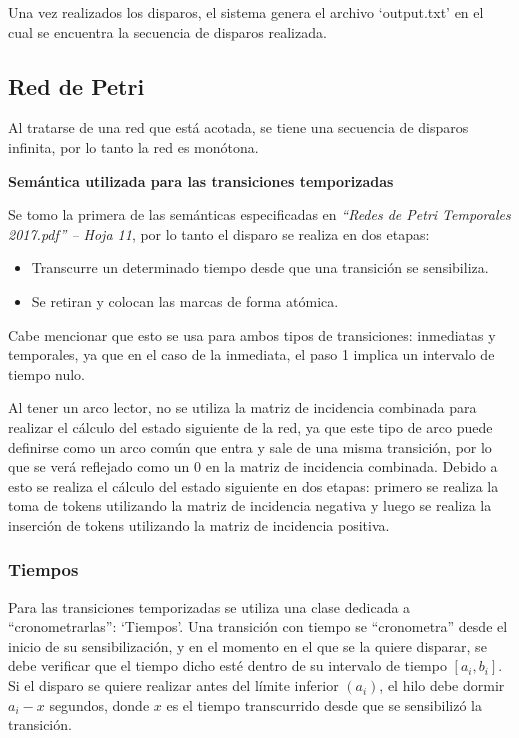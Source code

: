 \documentclass[12pt,a4paper]{article}
\begin{document}
Una vez realizados los disparos, el sistema genera el archivo `output.txt' en el cual se encuentra la secuencia de disparos realizada.

\subsection{Red de Petri}
Al tratarse de una red que está acotada, se tiene una secuencia de disparos infinita, por lo tanto la red es monótona.

\textbf{Semántica utilizada para las transiciones temporizadas}

Se tomo la primera de las semánticas especificadas en \textit{“Redes de Petri Temporales 2017.pdf” -- Hoja 11}, por lo tanto el disparo se realiza en dos etapas:

\begin{itemize}[leftmargin=1.5cm]
    \item Transcurre un determinado tiempo desde que una transición se sensibiliza.
    \item Se retiran y colocan las marcas de forma atómica.
\end{itemize}

Cabe mencionar que esto se usa para ambos tipos de transiciones: inmediatas y temporales, ya que en el caso de la inmediata, el paso 1 implica un intervalo de tiempo nulo.

Al tener un arco lector, no se utiliza la matriz de incidencia combinada para realizar el cálculo del estado siguiente de la red, ya que este tipo de arco puede definirse como un arco común que entra y sale de una misma transición, por lo que se verá reflejado como un 0 en la matriz de incidencia combinada. Debido a esto se realiza el cálculo del estado siguiente en dos etapas: primero se realiza la toma de tokens utilizando la matriz de incidencia negativa y luego se realiza la inserción de tokens utilizando la matriz de incidencia positiva.

\subsubsection{Tiempos}
Para las transiciones temporizadas se utiliza una clase dedicada a ``cronometrarlas”: ‘Tiempos’. Una transición con tiempo se ``cronometra” desde el inicio de su sensibilización, y en el momento en el que se la quiere disparar, se debe verificar que el tiempo dicho esté dentro de su intervalo de tiempo $[a_i , b_i]$. Si el disparo se quiere realizar antes del límite inferior $(a_i)$, el hilo debe dormir $a_i-x$ segundos, donde $x$ es el tiempo transcurrido desde que se sensibilizó la transición.
\end{document}
